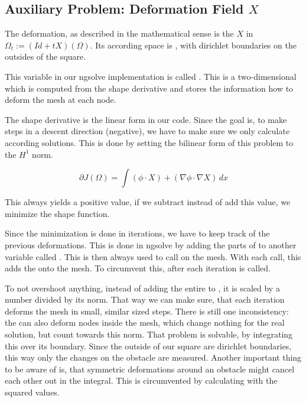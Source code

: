 \subsection{Auxiliary Problem: Deformation Field $X$}
The deformation, as described in the mathematical sense is the $X$ in $\Omega_t := (Id + tX )(\Omega)$.
Its according space is , with dirichlet boundaries on the outsides of the square.

This variable in our ngsolve implementation is called . This is a two-dimensional  which is computed from the shape derivative and stores the information how to deform the mesh at each node.

The shape derivative is the linear form  in our code. Since the goal is, to make steps in a descent direction (negative), we have to make sure we only calculate according solutions.
This is done by setting the bilinear form of this problem to the $H^1$ norm.

\begin{equation}
	\partial J(\Omega) = \int(\phi\cdot X)+(\nabla\phi\cdot \nabla X) \, dx
\end{equation}

This always yields a positive value, if we subtract instead of add this value, we minimize the shape function.

\begin{comment}
\begin{lstlisting}[language=Python, title=Solving For The Deformation, label=lst:deformation_solve]
	def SolveDeformationEquation():
	rhs = gfX.vec.CreateVector()
	rhs.data = dJOmega.vec - b.mat * gfX.vec
	update = gfX.vec.CreateVector()
	update.data = b.mat.Inverse(VEC.FreeDofs()) * rhs
	gfX.vec.data += update
\end{lstlisting}
\end{comment}

Since the minimization is done in iterations, we have to keep track of the previous deformations. This is done in ngsolve by adding the parts of  to another variable called . This  is then always used to call  on the mesh.
With each call, this adds the  onto the mesh. To circumvent this, after each iteration  is called.

To not overshoot anything, instead of adding the entire  to , it is scaled by a number divided by its norm. That way we can make sure, that each iteration deforms the mesh in small, similar sized steps.
There is still one inconsistency: the  can also deform nodes inside the mesh, which change nothing for the real solution, but count towards this norm. That problem is solvable, by integrating this  over its boundary. Since the outside of our square are dirichlet boundaries, this way only the changes on the obstacle are measured. Another important thing to be aware of is, that symmetric deformations around an obstacle might cancel each other out in the integral. This is circumvented by calculating with the squared values.




